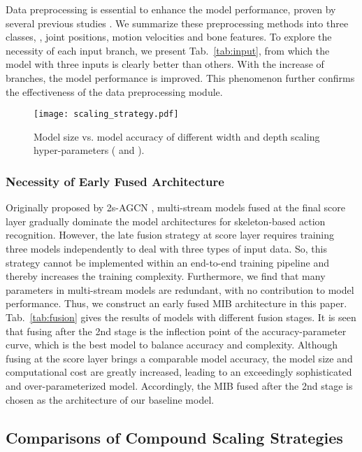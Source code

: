 \documentclass[10pt,journal,compsoc]{IEEEtran}
\begin{document}
Data preprocessing is essential to enhance the model performance, proven by several previous studies \cite{song2019richly,si2018skeleton,shi2019two}. We summarize these preprocessing methods into three classes, \ie, joint positions, motion velocities and bone features. To explore the necessity of each input branch, we present Tab.~\ref{tab:input}, from which the model with three inputs is clearly better than others. With the increase of branches, the model performance is improved. This phenomenon further confirms the effectiveness of the data preprocessing module.

\begin{figure}[t]
  \centerline{\texttt{[image: scaling\_strategy.pdf]}}
  \vspace{-0.4cm}
  \caption{Model size vs. model accuracy of different width and depth scaling hyper-parameters ( and ). \bv}\label{fig:scaling}
\end{figure}

\subsubsection{Necessity of Early Fused Architecture}
\label{sssec:compare_fusion}

Originally proposed by 2s-AGCN \cite{shi2019two}, multi-stream models fused at the final score layer gradually dominate the model architectures for skeleton-based action recognition. However, the late fusion strategy at score layer requires training three models independently to deal with three types of input data. So, this strategy cannot be implemented within an end-to-end training pipeline and thereby increases the training complexity. Furthermore, we find that many parameters in multi-stream models are redundant, with no contribution to model performance. Thus, we construct an early fused MIB architecture in this paper. Tab.~\ref{tab:fusion} gives the results of models with different fusion stages. It is seen that fusing after the 2nd stage is the inflection point of the accuracy-parameter curve, which is the best model to balance accuracy and complexity. Although fusing at the score layer brings a comparable model accuracy, the model size and computational cost are greatly increased, leading to an exceedingly sophisticated and over-parameterized model. Accordingly, the MIB fused after the 2nd stage is chosen as the architecture of our baseline model.

\subsection{Comparisons of Compound Scaling Strategies}
\label{ssec:compound}
\end{document}
